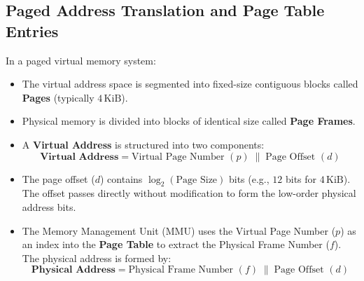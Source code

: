 \documentclass[12pt,a4paper]{article}
\begin{document}
\subsection{Paged Address Translation and Page Table Entries}
In a paged virtual memory system:
\begin{itemize}[leftmargin=*]
  \item The virtual address space is segmented into fixed-size contiguous blocks called \textbf{Pages} (typically $4\,\mathrm{KiB}$).
  \item Physical memory is divided into blocks of identical size called \textbf{Page Frames}.
  \item A \textbf{Virtual Address} is structured into two components:
  \[
  \mathbf{\text{Virtual Address}} = \text{Virtual Page Number } (p) \;\|\; \text{Page Offset } (d)
  \]
  \item The page offset ($d$) contains $\log_2(\text{Page Size})$ bits (e.g., $12$ bits for $4\,\mathrm{KiB}$). The offset passes directly without modification to form the low-order physical address bits.
  \item The Memory Management Unit (MMU) uses the Virtual Page Number ($p$) as an index into the \textbf{Page Table} to extract the Physical Frame Number ($f$). The physical address is formed by:
  \[
  \mathbf{\text{Physical Address}} = \text{Physical Frame Number } (f) \;\|\; \text{Page Offset } (d)
  \]
\end{itemize}
\end{document}
